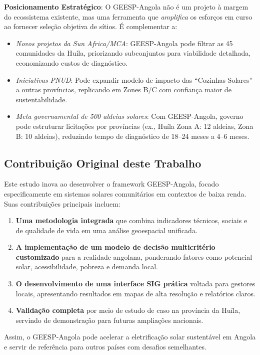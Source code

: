 \documentclass[12pt, a4paper]{article}
\begin{document}
\textbf{Posicionamento Estratégico}: O GEESP-Angola não é um projeto à margem do ecossistema existente, mas uma ferramenta que \textit{amplifica} os esforços em curso ao fornecer seleção objetiva de sítios. É complementar a:
\begin{itemize}
\item \textit{Novos projetos da Sun Africa/MCA}: GEESP-Angola pode filtrar as 45 comunidades da Huíla, priorizando subconjuntos para viabilidade detalhada, economizando custos de diagnóstico.
\item \textit{Iniciativas PNUD}: Pode expandir modelo de impacto das ``Cozinhas Solares'' a outras províncias, replicando em Zones B/C com confiança maior de sustentabilidade.
\item \textit{Meta governamental de 500 aldeias solares}: Com GEESP-Angola, governo pode estruturar licitações por províncias (ex., Huíla Zona A: 12 aldeias, Zona B: 10 aldeias), reduzindo tempo de diagnóstico de 18--24 meses a 4--6 meses.
\end{itemize}

\subsection{Contribuição Original deste Trabalho}

Este estudo inova ao desenvolver o framework GEESP-Angola, focado especificamente em sistemas solares comunitários em contextos de baixa renda. Suas contribuições principais incluem:

\begin{enumerate}
\item \textbf{Uma metodologia integrada} que combina indicadores técnicos, sociais e de qualidade de vida em uma análise geoespacial unificada.
\item \textbf{A implementação de um modelo de decisão multicritério customizado} para a realidade angolana, ponderando fatores como potencial solar, acessibilidade, pobreza e demanda local.
\item \textbf{O desenvolvimento de uma interface SIG prática} voltada para gestores locais, apresentando resultados em mapas de alta resolução e relatórios claros.
\item \textbf{Validação completa} por meio de estudo de caso na província da Huíla, servindo de demonstração para futuras ampliações nacionais.
\end{enumerate}

Assim, o GEESP-Angola pode acelerar a eletrificação solar sustentável em Angola e servir de referência para outros países com desafios semelhantes.
\end{document}
